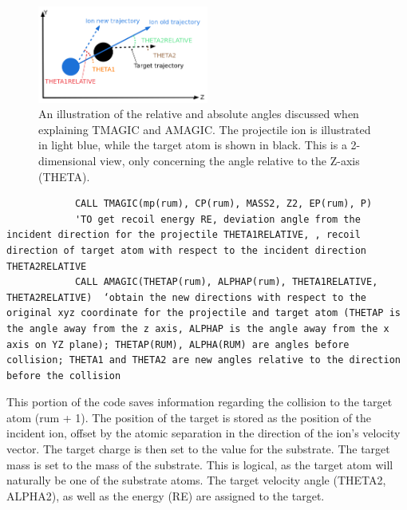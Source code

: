 \documentclass[10pt, reqno]{exam}
\begin{document}
\begin{figure}[h]
    \centering
    \includegraphics[width = 0.5\textwidth]{figures/relative_angles_explanation.png}
    \caption{An illustration of the relative and absolute angles discussed when explaining TMAGIC and AMAGIC. The projectile ion is illustrated in light blue, while the target atom is shown in black. This is a 2-dimensional view, only concerning the angle relative to the Z-axis (THETA).}
    \label{fig:relative angles explanation}
\end{figure}

\begin{verbatim}   
            CALL TMAGIC(mp(rum), CP(rum), MASS2, Z2, EP(rum), P)  
            'TO get recoil energy RE, deviation angle from the incident direction for the projectile THETA1RELATIVE, , recoil direction of target atom with respect to the incident direction THETA2RELATIVE
            CALL AMAGIC(THETAP(rum), ALPHAP(rum), THETA1RELATIVE, THETA2RELATIVE)  ‘obtain the new directions with respect to the original xyz coordinate for the projectile and target atom (THETAP is the angle away from the z axis, ALPHAP is the angle away from the x axis on YZ plane); THETAP(RUM), ALPHA(RUM) are angles before collision; THETA1 and THETA2 are new angles relative to the direction before the collision
\end{verbatim}

This portion of the code saves information regarding the collision to the target atom (rum + 1). The position of the target is stored as the position of the incident ion, offset by the atomic separation in the direction of the ion's velocity vector. The target charge is then set to the value for the substrate. The target mass is set to the mass of the substrate. This is logical, as the target atom will naturally be one of the substrate atoms. The target velocity angle (THETA2, ALPHA2), as well as the energy (RE) are assigned to the target.
\end{document}
